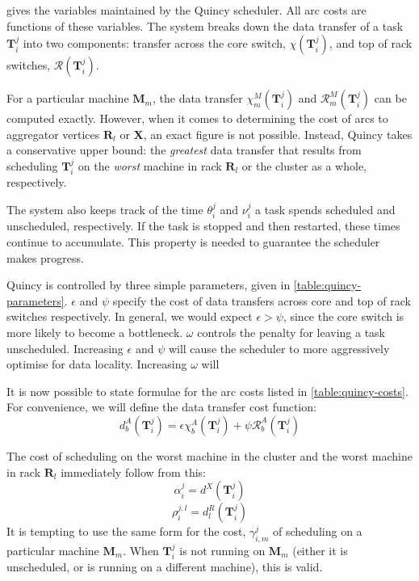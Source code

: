  gives the variables maintained by the Quincy scheduler. All arc costs are functions of these variables. The system breaks down the data transfer of a task $\mathbf{T}_{i}^{j}$ into two components: transfer across the core switch, $\chi\left(\mathbf{T}_{i}^{j}\right)$, and top of rack switches, $\mathcal{R}\left(\mathbf{T}_{i}^{j}\right)$.

For a particular machine $\mathbf{M}_m$, the data transfer $\chi_{m}^{M}\left(\mathbf{T}_{i}^{j}\right)$ and $\mathcal{R}_{m}^{M}\left(\mathbf{T}_{i}^{j}\right)$ can be computed exactly. However, when it comes to determining the cost of arcs to aggregator vertices $\mathbf{R}_l$ or $\mathbf{X}$, an exact figure is not possible. Instead, Quincy takes a conservative upper bound: the \emph{greatest} data transfer that results from scheduling $\mathbf{T}_{i}^{j}$ on the \emph{worst} machine in rack $\mathbf{R}_l$ or the cluster as a whole, respectively.

The system also keeps track of the time $\theta_i^j$ and $\nu_i^j$ a task spends scheduled and unscheduled, respectively. If the task is stopped and then restarted, these times continue to accumulate. This property is needed to guarantee the scheduler makes progress.

Quincy is controlled by three simple parameters, given in \cref{table:quincy-parameters}. $\epsilon$ and $\psi$ specify the cost of data transfers across core and top of rack switches respectively. In general, we would expect $\epsilon > \psi$, since the core switch is more likely to become a bottleneck. $\omega$ controls the penalty for leaving a task unscheduled\footnotemark. Increasing $\epsilon$ and $\psi$ will cause the scheduler to more aggressively optimise for data locality. Increasing $\omega$ will 

It is now possible to state formulae for the arc costs listed in \cref{table:quincy-costs}. For convenience, we will define the data transfer cost function:
\[d_{b}^{A}\left(\mathbf{T}_{i}^{j}\right) = \epsilon\chi_{b}^{A}\left(\mathbf{T}_{i}^{j}\right)+\psi\mathcal{R}_{b}^{A}\left(\mathbf{T}_{i}^{j}\right)\]

The cost of scheduling on the worst machine in the cluster and the worst machine in rack $\mathbf{R}_l$ immediately follow from this:
\[\alpha_{i}^{j} = d^X\left(\mathbf{T}_{i}^{j}\right)\]
\[\rho_{i}^{j,l} = d^R_l\left(\mathbf{T}_{i}^{j}\right)\]
It is tempting to use the same form for the cost, $\gamma^j_{i,m}$ of scheduling on a particular machine $\mathbf{M}_m$. When $\mathbf{T}_{i}^{j}$ is not running on $\mathbf{M}_m$ (either it is unscheduled, or is running on a different machine), this is valid. 

